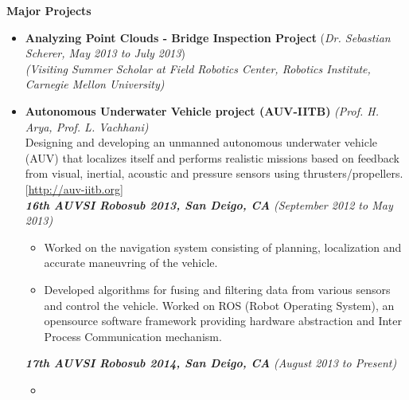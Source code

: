\documentclass[a4paper,11pt]{article}
\newcommand{\resheading}[1]{{\small \colorbox{mygrey}{\begin{minipage}{0.975\textwidth}{\textbf{#1 \vphantom{p\^{E}}}}\end{minipage}}}}
\begin{document}
\resheading{\textbf{\large{Major Projects}}}
\begin{itemize}

    \item \textbf{Analyzing Point Clouds - Bridge Inspection Project} \hfill (\emph{Dr. Sebastian Scherer, May 2013 to July 2013}) \\
        \emph{(Visiting Summer Scholar at Field Robotics Center, Robotics Institute, Carnegie Mellon University)}

    \item \textbf{Autonomous Underwater Vehicle project (AUV-IITB)} \hfill \emph{(Prof. H. Arya, Prof. L. Vachhani)} \\
        Designing and developing an unmanned autonomous underwater vehicle (AUV) that localizes itself and performs realistic missions based on feedback from visual, inertial, acoustic and pressure sensors using thrusters/propellers. \hfill  [\url{http://auv-iitb.org}] \\[0.1cm]
        \textbf{\emph{16th AUVSI Robosub 2013, San Deigo, CA}} \hfill \emph{(September 2012 to May 2013) } \\[-0.6cm]
        \begin{itemize}
            \item Worked on the navigation system consisting of planning, localization and accurate maneuvring of the vehicle.
            \item Developed algorithms for fusing and filtering data from various sensors and control the vehicle. Worked on ROS (Robot Operating System), an opensource software framework providing hardware abstraction and Inter Process Communication mechanism.
        \end{itemize}
        \textbf{\emph{17th AUVSI Robosub 2014, San Deigo, CA}} \hfill \emph{(August 2013 to Present) } \\[-0.6cm]
        \begin{itemize}
            \item 
        \end{itemize}


\end{itemize}
\end{document}
